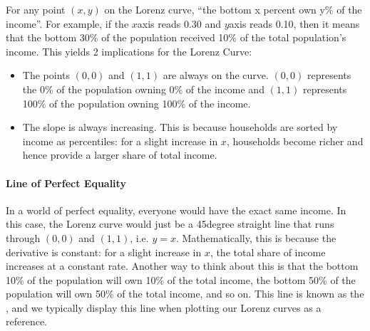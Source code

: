 \documentclass[letterpaper,10pt,english]{jupyterBook}
\begin{document}
\sphinxAtStartPar
For any point \((x,y)\) on the Lorenz curve, “the bottom x percent own y\% of the income”. For example, if the \(x\)\sphinxhyphen{}axis reads 0.30 and \(y\)\sphinxhyphen{}axis reads 0.10, then it means that the bottom 30\% of the population received 10\% of the total population’s income. This yields 2 implications for the Lorenz Curve:
\begin{itemize}
\item {} 
\sphinxAtStartPar
The points \((0,0)\) and \((1,1)\) are always on the curve. \((0,0)\) represents the 0\% of the population owning 0\% of the income and \((1,1)\) represents 100\% of the population owning 100\% of the income.

\item {} 
\sphinxAtStartPar
The slope is always increasing. This is because households are sorted by income as percentiles: for a slight increase in \(x\), households become richer and hence provide a larger share of total income.

\end{itemize}


\paragraph{Line of Perfect Equality}
\label{\detokenize{content/06-inequality/inequality:line-of-perfect-equality}}
\sphinxAtStartPar
In a world of perfect equality, everyone would have the exact same income. In this case, the Lorenz curve would just be a 45\sphinxhyphen{}degree straight line that runs through \((0,0)\) and \((1,1)\), i.e. \(y=x\). Mathematically, this is because the derivative is constant: for a slight increase in \(x\), the total share of income increases at a constant rate. Another way to think about this is that the bottom 10\% of the population will own 10\% of the total income, the bottom 50\% of the population will own 50\% of the total income, and so on. This line is known as the , and we typically display this line when plotting our Lorenz curves as a reference.
\end{document}
